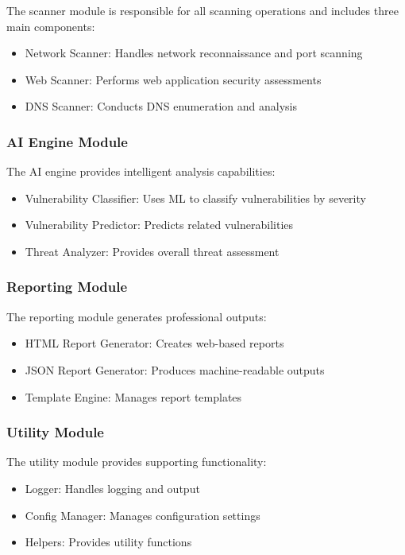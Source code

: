 \documentclass[12pt,a4paper]{report}
\begin{document}
The scanner module is responsible for all scanning operations and includes three main components:

\begin{itemize}
    \item Network Scanner: Handles network reconnaissance and port scanning
    \item Web Scanner: Performs web application security assessments
    \item DNS Scanner: Conducts DNS enumeration and analysis
\end{itemize}

\subsubsection{AI Engine Module}

The AI engine provides intelligent analysis capabilities:

\begin{itemize}
    \item Vulnerability Classifier: Uses ML to classify vulnerabilities by severity
    \item Vulnerability Predictor: Predicts related vulnerabilities
    \item Threat Analyzer: Provides overall threat assessment
\end{itemize}

\subsubsection{Reporting Module}

The reporting module generates professional outputs:

\begin{itemize}
    \item HTML Report Generator: Creates web-based reports
    \item JSON Report Generator: Produces machine-readable outputs
    \item Template Engine: Manages report templates
\end{itemize}

\subsubsection{Utility Module}

The utility module provides supporting functionality:

\begin{itemize}
    \item Logger: Handles logging and output
    \item Config Manager: Manages configuration settings
    \item Helpers: Provides utility functions
\end{itemize}
\end{document}

